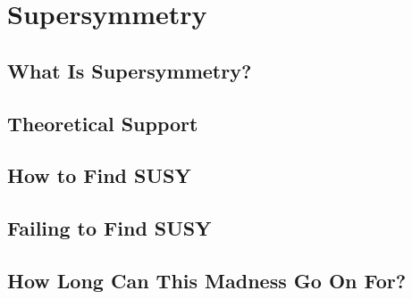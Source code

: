 \chapter{Supersymmetry}\label{chap:SUSY}

\section{What Is Supersymmetry?}

\section{Theoretical Support}

\section{How to Find SUSY}

\section{Failing to Find SUSY}

\section{How Long Can This Madness Go On For?}